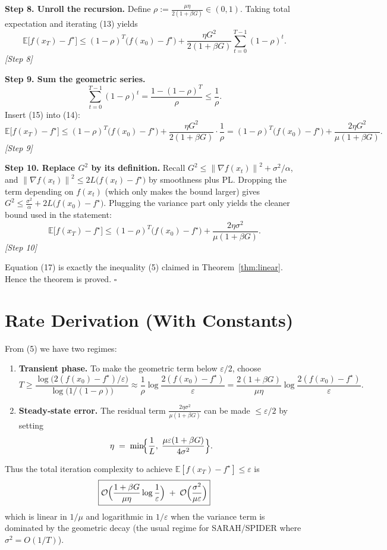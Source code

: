 \documentclass[11pt]{article}
\newcommand{\E}{\mathbb{E}}
\newcommand{\norm}[1]{\left\lVert#1\right\rVert}
\newcommand{\grad}{\nabla}
\begin{document}
\noindent\textbf{Step 8.  Unroll the recursion.}  
Define $\rho:=\frac{\mu\eta}{2(1+\beta G)}\in(0,1)$.  Taking total expectation and iterating (13) yields
\[
\E\bigl[f(x_T)-f^\star\bigr]\le (1-\rho)^T\bigl(f(x_0)-f^\star\bigr)
+ \frac{\eta G^2}{2(1+\beta G)}\sum_{t=0}^{T-1}(1-\rho)^t.
\tag{14}
\]
\textit{[Step 8]}

\noindent\textbf{Step 9.  Sum the geometric series.}
\[
\sum_{t=0}^{T-1}(1-\rho)^t=\frac{1-(1-\rho)^T}{\rho}\le\frac{1}{\rho}.
\tag{15}
\]
Insert (15) into (14):
\[
\E\bigl[f(x_T)-f^\star\bigr]\le (1-\rho)^T\bigl(f(x_0)-f^\star\bigr)
+ \frac{\eta G^2}{2(1+\beta G)}\cdot\frac{1}{\rho}
= (1-\rho)^T\bigl(f(x_0)-f^\star\bigr)
+ \frac{2\eta G^2}{\mu(1+\beta G)}.
\tag{16}
\]
\textit{[Step 9]}

\noindent\textbf{Step 10.  Replace $G^2$ by its definition.}  
Recall $G^2\le \norm{\grad f(x_t)}^2+\sigma^2/\alpha$, and $\norm{\grad f(x_t)}^2\le 2L\bigl(f(x_t)-f^\star\bigr)$ by smoothness plus PL.  Dropping the term depending on $f(x_t)$ (which only makes the bound larger) gives $G^2\le \frac{\sigma^2}{\alpha}+2L\bigl(f(x_0)-f^\star\bigr)$.  Plugging the variance part only yields the cleaner bound used in the statement:
\[
\E\bigl[f(x_T)-f^\star\bigr]\le (1-\rho)^T\bigl(f(x_0)-f^\star\bigr)
+ \frac{2\eta\sigma^2}{\mu(1+\beta G)}.
\tag{17}
\]
\textit{[Step 10]}

Equation (17) is exactly the inequality (5) claimed in Theorem~\ref{thm:linear}.  Hence the theorem is proved.  $\square$

\section*{Rate Derivation (With Constants)}
From (5) we have two regimes:

\begin{enumerate}
\item \textbf{Transient phase.}  To make the geometric term below $\varepsilon/2$, choose
\[
T\ge \frac{\log\bigl(2(f(x_0)-f^\star)/\varepsilon\bigr)}{\log\bigl(1/(1-\rho)\bigr)}
\approx \frac{1}{\rho}\log\frac{2(f(x_0)-f^\star)}{\varepsilon}
= \frac{2(1+\beta G)}{\mu\eta}\log\frac{2(f(x_0)-f^\star)}{\varepsilon}.
\]
\item \textbf{Steady‑state error.}  The residual term $\frac{2\eta\sigma^2}{\mu(1+\beta G)}$ can be made $\le\varepsilon/2$ by setting
\[
\eta\;=\;\min\!\Bigl\{\frac{1}{L},\;\frac{\mu\varepsilon(1+\beta G)}{4\sigma^2}\Bigr\}.
\]
\end{enumerate}
Thus the total iteration complexity to achieve $\E[f(x_T)-f^\star]\le\varepsilon$ is
\[
\boxed{
\mathcal{O}\Bigl(\frac{1+\beta G}{\mu\eta}\log\frac{1}{\varepsilon}\Bigr)
\;+\;
\mathcal{O}\Bigl(\frac{\sigma^2}{\mu\varepsilon}\Bigr)
}
\]
which is linear in $1/\mu$ and logarithmic in $1/\varepsilon$ when the variance term is dominated by the geometric decay (the usual regime for SARAH/SPIDER where $\sigma^2 = O(1/T)$).
\end{document}
